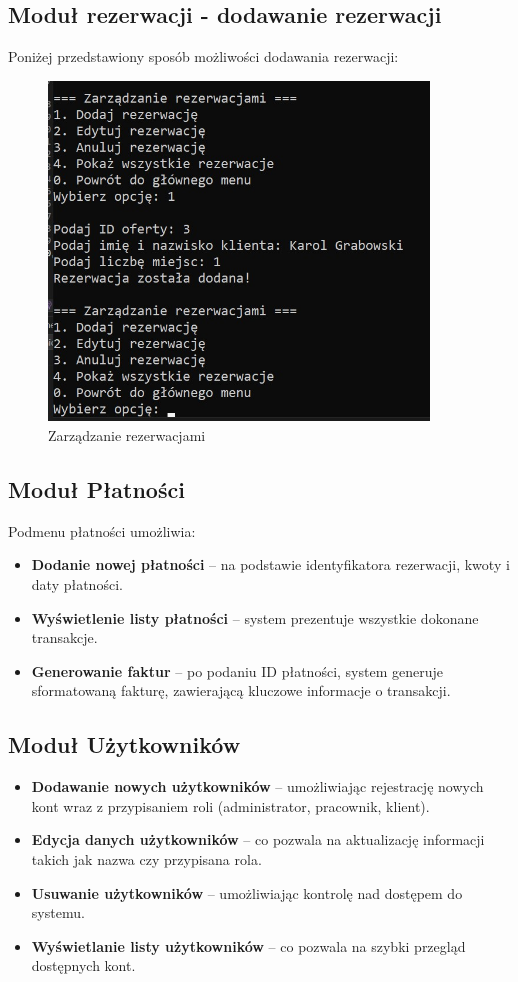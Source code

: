 \subsection{Moduł rezerwacji - dodawanie rezerwacji}
Poniżej przedstawiony sposób możliwości dodawania rezerwacji: 
\begin{figure}[htbp]
  \centering
  \includegraphics[width=0.9\textwidth]{figures/rezerwacja.jpg} 
  \caption{Zarządzanie rezerwacjami}
  \label{fig:obrazek}
\end{figure}


\subsection{Moduł Płatności}
Podmenu płatności umożliwia:
\begin{itemize}
    \item \textbf{Dodanie nowej płatności} – na podstawie identyfikatora rezerwacji, kwoty i daty płatności.
    \item \textbf{Wyświetlenie listy płatności} – system prezentuje wszystkie dokonane transakcje.
    \item \textbf{Generowanie faktur} – po podaniu ID płatności, system generuje sformatowaną fakturę, zawierającą kluczowe informacje o transakcji.
\end{itemize}


\subsection{Moduł Użytkowników}
\begin{itemize}
    \item \textbf{Dodawanie nowych użytkowników} – umożliwiając rejestrację nowych kont wraz z przypisaniem roli (administrator, pracownik, klient).
    \item \textbf{Edycja danych użytkowników} – co pozwala na aktualizację informacji takich jak nazwa czy przypisana rola.
    \item \textbf{Usuwanie użytkowników} – umożliwiając kontrolę nad dostępem do systemu.
    \item \textbf{Wyświetlanie listy użytkowników} – co pozwala na szybki przegląd dostępnych kont.
\end{itemize}


